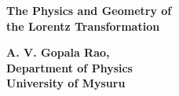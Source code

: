 \thispagestyle{empty}
\begin{center}
{\fontsize{20}{22} \selectfont\sf \textbf{The Physics and Geometry of\\[4pt] the Lorentz Transformation}}\\[10pt]
{\fontsize{18}{20} \selectfont {\textbf{\emph{}}}}
\vfill


{\fontsize{12}{14}\selectfont\bfseries 
A. V. Gopala Rao, \\[8pt]
Department of Physics\\[8pt] University of Mysuru\\[8pt]
}
\vfill




\end{center}






